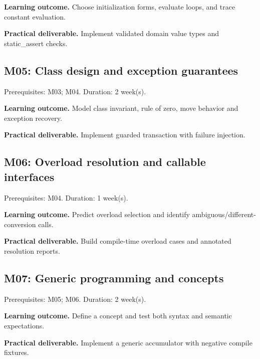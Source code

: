 \documentclass[11pt]{article}
\begin{document}
\textbf{Learning outcome.} Choose initialization forms, evaluate loops, and trace constant evaluation.

\textbf{Practical deliverable.} Implement validated domain value types and static\_assert checks.

\subsection{M05: Class design and exception guarantees}
Prerequisites: M03; M04. Duration: 2 week(s).

\textbf{Learning outcome.} Model class invariant, rule of zero, move behavior and exception recovery.

\textbf{Practical deliverable.} Implement guarded transaction with failure injection.

\subsection{M06: Overload resolution and callable interfaces}
Prerequisites: M04. Duration: 1 week(s).

\textbf{Learning outcome.} Predict overload selection and identify ambiguous/different-conversion calls.

\textbf{Practical deliverable.} Build compile-time overload cases and annotated resolution reports.

\subsection{M07: Generic programming and concepts}
Prerequisites: M05; M06. Duration: 2 week(s).

\textbf{Learning outcome.} Define a concept and test both syntax and semantic expectations.

\textbf{Practical deliverable.} Implement a generic accumulator with negative compile fixtures.

\end{document}
